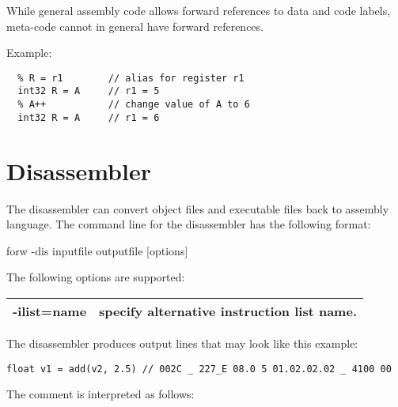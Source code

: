 \documentclass[forwardcom.tex]{subfiles}
\begin{document}
While general assembly code allows forward references to data and code labels, meta-code cannot in general have forward references.
\vspace{2mm}

Example:
\vspace{2mm}

\begin{lstlisting}[frame=single]
  % A = 5         // meta-variable integer A = 5
  % R = r1        // alias for register r1
  int32 R = A     // r1 = 5
  % A++           // change value of A to 6
  int32 R = A     // r1 = 6
\end{lstlisting}
\vspace{2mm}


\section{Disassembler} \label{disassembler}

The disassembler can convert object files and executable files back to assembly language.
The command line for the disassembler has the following format:

\vspace{2mm}
\hspace{5mm} {\ttfamily forw -dis inputfile outputfile [options]}

\vspace{2mm}
The following options are supported:\\
\begin{tabular}{|p{22mm}p{140mm}|}
\hline
-ilist=name & specify alternative instruction list name.\\
\hline
\end{tabular}
\vspace{2mm}

The disassembler produces output lines that may look like this example:

\begin{lstlisting}
float v1 = add(v2, 2.5) // 002C _ 227_E 08.0 5 01.02.02.02 _ 4100 00
\end{lstlisting}
\vspace{2mm}

The comment is interpreted as follows:\\
\vspace{2mm}
\end{document}
